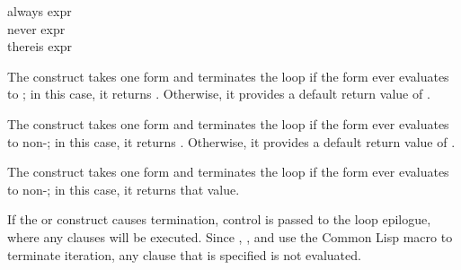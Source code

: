 \begin{defloop}
always expr \\
never expr \\
thereis expr

The  construct takes one form and terminates the loop 
  if the form ever evaluates to ; in this case, it returns
  .  Otherwise, it provides a default return value of .

  The  construct takes one form and terminates the loop
  if the form ever evaluates to non-; in this case, it returns
  .  Otherwise, it provides a default return value of .

  The  construct takes one form and terminates the loop
  if the form ever evaluates to non-; in this case, it returns
  that value.

If the  or  construct causes termination,
control is passed to the loop epilogue, where any 
clauses will be executed.  Since , , and 
 use the Common Lisp macro  to terminate
iteration, any  clause that is specified is not
evaluated.


\end{defloop}
